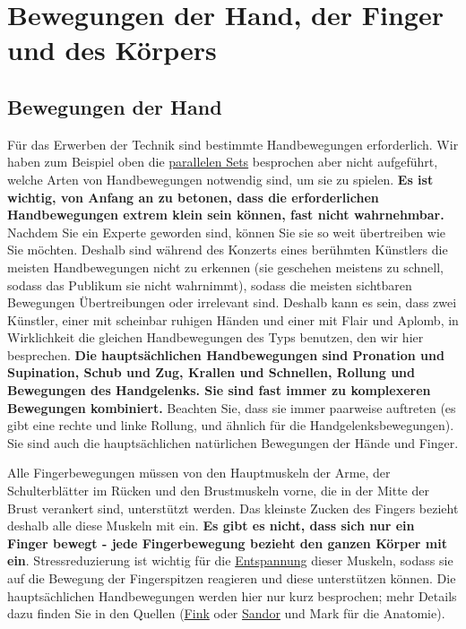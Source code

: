 
\section{Bewegungen der Hand, der Finger und des Körpers}\hypertarget{c1iii4}{}

\subsection{Bewegungen der Hand}

Für das Erwerben der Technik sind bestimmte Handbewegungen erforderlich.
Wir haben zum Beispiel oben die \hyperlink{c1ii11}{parallelen Sets} besprochen aber nicht aufgeführt, welche Arten von Handbewegungen notwendig sind, um sie zu spielen.
\textbf{Es ist wichtig, von Anfang an zu betonen, dass die erforderlichen Handbewegungen extrem klein sein können, fast nicht wahrnehmbar.}
Nachdem Sie ein Experte geworden sind, können Sie sie so weit übertreiben wie Sie möchten.
Deshalb sind während des Konzerts eines berühmten Künstlers die meisten Handbewegungen nicht zu erkennen (sie geschehen meistens zu schnell, sodass das Publikum sie nicht wahrnimmt), sodass die meisten sichtbaren Bewegungen Übertreibungen oder irrelevant sind.
Deshalb kann es sein, dass zwei Künstler, einer mit scheinbar ruhigen Händen und einer mit Flair und Aplomb, in Wirklichkeit die gleichen Handbewegungen des Typs benutzen, den wir hier besprechen.
\textbf{Die hauptsächlichen Handbewegungen sind Pronation und Supination, Schub und Zug, Krallen und Schnellen, Rollung und Bewegungen des Handgelenks.
Sie sind fast immer zu komplexeren Bewegungen kombiniert.}
Beachten Sie, dass sie immer paarweise auftreten (es gibt eine rechte und linke Rollung, und ähnlich für die Handgelenksbewegungen).
Sie sind auch die hauptsächlichen natürlichen Bewegungen der Hände und Finger.

Alle Fingerbewegungen müssen von den Hauptmuskeln der Arme, der Schulterblätter im Rücken und den Brustmuskeln vorne, die in der Mitte der Brust verankert sind, unterstützt werden.
Das kleinste Zucken des Fingers bezieht deshalb alle diese Muskeln mit ein.
\textbf{Es gibt es nicht, dass sich nur ein Finger bewegt - jede Fingerbewegung bezieht den ganzen Körper mit ein}.
Stressreduzierung ist wichtig für die \hyperlink{c1ii14}{Entspannung} dieser Muskeln, sodass sie auf die Bewegung der Fingerspitzen reagieren und diese unterstützen können.
Die hauptsächlichen Handbewegungen werden hier nur kurz besprochen; mehr Details dazu finden Sie in den Quellen (\hyperlink{Fink}{Fink} oder \hyperlink{Sandor}{Sandor} und Mark für die Anatomie).


